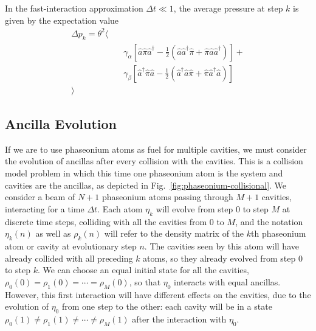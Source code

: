 \documentclass[]{article}
\renewcommand{\a}{\hat{a}}
\newcommand{\ad}{\hat{a}^\dagger}
\renewcommand{\tt}{\theta^2}
\newcommand{\ga}{\gamma_\alpha}
\newcommand{\gb}{\gamma_\beta}
\begin{document}
In the fast-interaction approximation $\Delta t\ll1$, the average pressure at step $k$ is given by the expectation value
\begin{align}
    \Delta p_k = \tt \big \langle&\\
    &\quad\ga\left[\a\hat{\pi}\ad - \frac{1}{2}\left(\a\ad\hat\pi+\hat\pi\a\ad\right) \right] +\\
    &\quad\gb\left[\ad\hat{\pi}\a - \frac{1}{2}\left(\ad\a\hat\pi+\hat\pi\ad\a\right) \right] \\
    \big\rangle
\end{align}

\newpage
\subsection{Ancilla Evolution}
If we are to use phaseonium atoms as fuel for multiple cavities, we must consider the evolution of ancillas after every collision with the cavities.
This is a collision model problem in which this time one phaseonium atom is the system and cavities are the ancillas, as depicted in Fig.~\ref{fig:phaseonium-collisional}.
We consider a beam of $N + 1$ phaseonium atoms passing through $M + 1$ cavities, interacting for a time $\Delta t$. 
Each atom $\eta_k$ will evolve from step $0$ to step $M$ at discrete time steps, colliding with all the cavities from $0$ to $M$, and the notation $\eta_k(n)$ as well as $\rho_k(n)$ will refer to the density matrix of the $k$th phaseonium atom or cavity at evolutionary step $n$.
The cavities seen by this atom will have already collided with all preceding $k$ atoms, so they already evolved from step $0$ to step $k$.
We can choose an equal initial state for all the cavities, $\rho_0(0)=\rho_1(0)=\cdots=\rho_M(0)$, so that $\eta_0$ interacts with equal ancillas.
However, this first interaction will have different effects on the cavities, due to the evolution of $\eta_0$ from one step to the other: each cavity will be in a state $\rho_0(1)\neq\rho_1(1)\neq\cdots\neq\rho_M(1)$ after the interaction with $\eta_0$.
\end{document}
